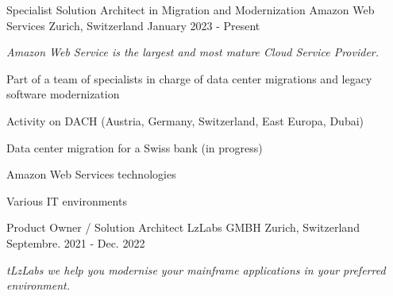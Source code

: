 \clearpage



\begin{cventries}
    \cventry
    {Specialist Solution Architect in Migration and Modernization} %
    {Amazon Web Services} %
    {Zurich, Switzerland} %
    {January 2023 - Present} %
    {
        \experience
            {
                \begin{cvitems} %
                    \item{\emph{Amazon Web Service is the largest and most mature Cloud Service Provider.}}
                    \item {Part of a team of specialists in charge of data center migrations and legacy software modernization }
                    \item {Activity on DACH (Austria, Germany, Switzerland, East Europa, Dubai) }
                    \end{cvitems}
            }
            {
               \begin{cvitems} %
                \item {Data center migration for a Swiss bank (in progress)}
               \end{cvitems}
            }
            {
                \begin{cvitems} %
                    \item{Amazon Web Services technologies}
                    \item{Various IT environments}
                \end{cvitems}
            }            
    }%
    \cventry
    {Product Owner / Solution Architect} %
    {LzLabs GMBH} %
    {Zurich, Switzerland} %
    {Septembre. 2021 - Dec. 2022} %
    {
        \experience
            {
                \begin{cvitems} %
                    \item{\emph{tLzLabs we help you modernise your mainframe applications in your preferred environment.}}

\end{cvitems}}}
\end{cventries}
